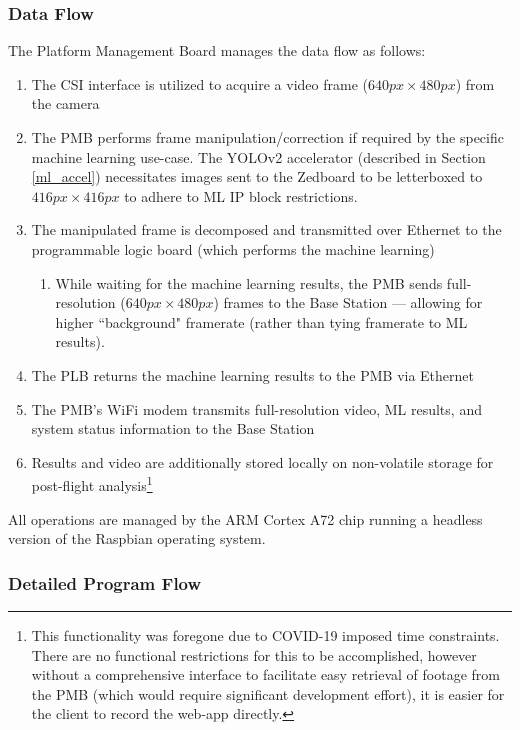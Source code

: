 \subsubsection{Data Flow}
\label{pmb_dataflow}
The Platform Management Board manages the data flow as follows:
\begin{enumerate}
\item The CSI interface is utilized to acquire a video frame ($640px \times 480px$) from the camera
\item The PMB performs frame manipulation/correction if required by the specific machine learning use-case. The YOLOv2 accelerator (described in Section \ref{ml_accel}) necessitates images sent to the Zedboard to be letterboxed to $416px \times 416px$ to adhere to ML IP block restrictions.
\item The manipulated frame is decomposed and transmitted over Ethernet to the programmable logic board (which performs the machine learning)
\begin{enumerate}
\item While waiting for the machine learning results, the PMB sends full-resolution ($640px \times 480px$) frames to the Base Station --- allowing for higher ``background" framerate (rather than tying framerate to ML results).
\end{enumerate}
\item The PLB returns the machine learning results to the PMB via Ethernet
\item The PMB's WiFi modem transmits full-resolution video, ML results, and system status information to the Base Station
\item Results and video are additionally stored locally on non-volatile storage for post-flight analysis\footnote{This functionality was foregone due to COVID-19 imposed time constraints. There are no functional restrictions for this to be accomplished, however without a comprehensive interface to facilitate easy retrieval of footage from the PMB (which would require significant development effort), it is easier for the client to record the web-app directly.}
\end{enumerate}

All operations are managed by the ARM Cortex A72 chip running a headless version of the Raspbian operating system. 

\subsubsection{Detailed Program Flow}

